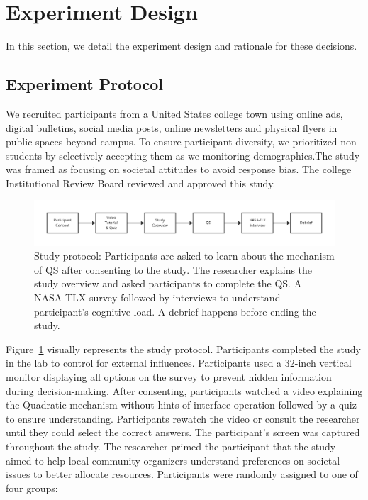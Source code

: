 \section{Experiment Design}
\label{sec:experiment}
In this section, we detail the experiment design and rationale for these decisions.

\subsection{Experiment Protocol}
We recruited participants from a United States college town using online ads, digital bulletins, social media posts, online newsletters and physical flyers in public spaces beyond campus. To ensure participant diversity, we prioritized non-students by selectively accepting them as we monitoring demographics.The study was framed as focusing on societal attitudes to avoid response bias. The college Institutional Review Board reviewed and approved this study.

\begin{figure}[ht]
    \centering
    \includegraphics[width=1\textwidth]{content/image/study_flow.pdf}
    \caption{Study protocol: Participants are asked to learn about the mechanism of QS after consenting to the study. The researcher explains the study overview and asked participants to complete the QS. A NASA-TLX survey followed by interviews to understand participant's cognitive load. A debrief happens before ending the study.}
    \label{fig:studyProtocol}
\end{figure}

Figure~\ref{fig:studyProtocol} visually represents the study protocol. Participants completed the study in the lab to control for external influences. Participants used a 32-inch vertical monitor displaying all options on the survey to prevent hidden information during decision-making. After consenting, participants watched a video explaining the Quadratic mechanism without hints of interface operation followed by a quiz to ensure understanding. Participants rewatch the video or consult the researcher until they could select the correct answers. The participant's screen was captured throughout the study. The researcher primed the participant that the study aimed to help local community organizers understand preferences on societal issues to better allocate resources. Participants were randomly assigned to one of four groups:

